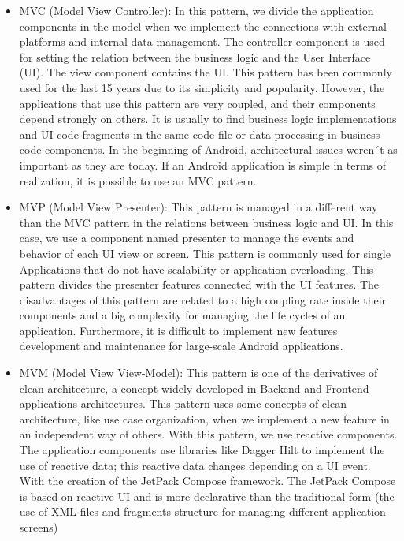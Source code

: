\begin{itemize}
	\item MVC (Model View Controller): In this pattern, we divide the application components in the model when we implement the connections with external platforms and internal data management. The controller component is used for setting the relation between the business logic and the User Interface (UI). The view component contains the UI. This pattern has been commonly used for the last 15 years due to its simplicity and popularity. However, the applications that use this pattern are very coupled, and their components depend strongly on others. It is usually to find business logic implementations and UI code fragments in the same code file or data processing in business code components.  In the beginning of Android, architectural issues weren´t as important as they are today. If an Android application is simple in terms of realization, it is possible to use an MVC pattern.
	
	\item MVP (Model View Presenter): This pattern is managed in a different way than the MVC pattern in the relations between business logic and UI. In this case, we use a component named presenter to manage the events and behavior of each UI view or screen. This pattern is commonly used for single Applications that do not have scalability or application overloading. This pattern divides the presenter features connected with the UI features. The disadvantages of this pattern are related to a high coupling rate inside their components and a big complexity for managing the life cycles of an application. Furthermore, it is difficult to implement new features development and maintenance for large-scale Android applications.
	
	\item MVM (Model View View-Model): This pattern is one of the derivatives of clean architecture, a concept widely developed in Backend and Frontend applications architectures. This pattern uses some concepts of clean architecture, like use case organization, when we implement a new feature in an independent way of others. With this pattern, we use reactive components. The application components use libraries like Dagger Hilt to implement the use of reactive data; this reactive data changes depending on a UI event. With the creation of the JetPack Compose framework. The JetPack Compose is based on reactive UI and is more declarative than the traditional form (the use of XML files and fragments structure for managing different application screens)
\end{itemize}

